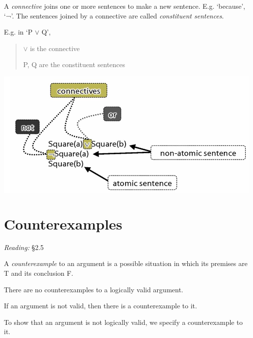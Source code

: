 \documentclass[12pt]{extarticle}
\begin{document}
\begin{multicols*}{3}
A \emph{connective} joins one or more sentences to make a new sentence. E.g. ‘because’, ‘¬’. The sentences joined by a connective are called \emph{constituent sentences}.
 
E.g. in ‘P $\lor{}$ Q’,
 
\begin{quote}
 
$\lor{}$ is the connective
 
P, Q are the constituent sentences
 
\end{quote}
 
\begin{center}
\includegraphics[scale=0.3]{img/terminology_more.png}
\end{center}
 
 
\section{Counterexamples}
 
\emph{Reading:} §2.5
 
A \emph{counterexample} to an argument is a possible situation in which its premises are T and its conclusion F.
 
There are no counterexamples to a logically valid argument.
 
If an argument is not valid, then there is a counterexample to it.
 
To show that an argument is not logically valid, we specify a counterexample to it.
 
 

\end{multicols*}
\end{document}
